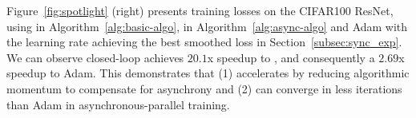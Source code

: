 Figure~\ref{fig:spotlight} (right) 
presents training losses on the CIFAR100 ResNet, using \tuner in Algorithm~\ref{alg:basic-algo}, \asynctuner in Algorithm~\ref{alg:async-algo} and Adam with the learning rate achieving the best smoothed loss in Section~\ref{subsec:sync_exp}.
We can observe closed-loop \tuner achieves $20.1$x speedup to \tuner, 
and consequently a $2.69$x speedup to Adam.
This demonstrates that (1) \asynctuner accelerates by reducing algorithmic momentum to compensate for asynchrony and (2) can converge in less iterations than Adam in asynchronous-parallel training. 




